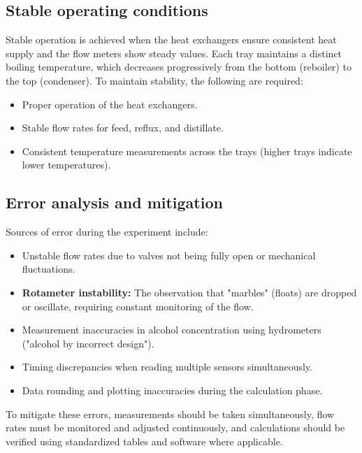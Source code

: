 \subsection{Stable operating conditions}

Stable operation is achieved when the heat exchangers ensure consistent heat supply and the flow meters show steady values. Each tray maintains a distinct boiling temperature, which decreases progressively from the bottom (reboiler) to the top (condenser). To maintain stability, the following are required:
\begin{itemize}
    \item Proper operation of the heat exchangers.
    \item Stable flow rates for feed, reflux, and distillate.
    \item Consistent temperature measurements across the trays (higher trays indicate lower temperatures).
\end{itemize}

\subsection{Error analysis and mitigation}

Sources of error during the experiment include:
\begin{itemize}
    \item Unstable flow rates due to valves not being fully open or mechanical fluctuations.
    \item \textbf{Rotameter instability:} The observation that "marbles" (floats) are dropped or oscillate, requiring constant monitoring of the flow.
    \item Measurement inaccuracies in alcohol concentration using hydrometers ("alcohol by incorrect design").
    \item Timing discrepancies when reading multiple sensors simultaneously.
    \item Data rounding and plotting inaccuracies during the calculation phase.
\end{itemize}

To mitigate these errors, measurements should be taken simultaneously, flow rates must be monitored and adjusted continuously, and calculations should be verified using standardized tables and software where applicable.
